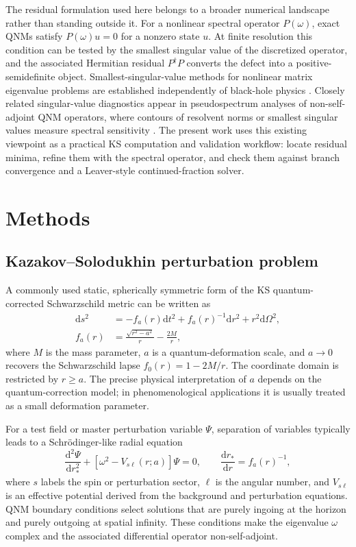 ﻿\documentclass[12pt,a4paper]{article}
\newcommand{\dd}{\mathrm{d}}
\begin{document}
The residual formulation used here belongs to a broader numerical landscape rather than standing outside it. For a nonlinear spectral operator \(P(\omega)\), exact QNMs satisfy \(P(\omega)u=0\) for a nonzero state \(u\). At finite resolution this condition can be tested by the smallest singular value of the discretized operator, and the associated Hermitian residual \(P^\dagger P\) converts the defect into a positive-semidefinite object. Smallest-singular-value methods for nonlinear matrix eigenvalue problems are established independently of black-hole physics \cite{Sadkane2023}. Closely related singular-value diagnostics appear in pseudospectrum analyses of non-self-adjoint QNM operators, where contours of resolvent norms or smallest singular values measure spectral sensitivity \cite{Jaramillo2021,Cao2024}. The present work uses this existing viewpoint as a practical KS computation and validation workflow: locate residual minima, refine them with the spectral operator, and check them against branch convergence and a Leaver-style continued-fraction solver.

\section{Methods}

\subsection{Kazakov--Solodukhin perturbation problem}

A commonly used static, spherically symmetric form of the KS quantum-corrected Schwarzschild metric can be written as
\begin{equation}
\begin{aligned}
\dd s^2 &=
-f_a(r)\dd t^2 + f_a(r)^{-1}\dd r^2
+ r^2 \dd\Omega^2,\\
f_a(r)&=\frac{\sqrt{r^2-a^2}}{r}-\frac{2M}{r},
\end{aligned}
\label{eq:ksmetric}
\end{equation}
where \(M\) is the mass parameter, \(a\) is a quantum-deformation scale, and \(a\to0\) recovers the Schwarzschild lapse \(f_0(r)=1-2M/r\). The coordinate domain is restricted by \(r\geq a\). The precise physical interpretation of \(a\) depends on the quantum-correction model; in phenomenological applications it is usually treated as a small deformation parameter.

For a test field or master perturbation variable \(\Psi\), separation of variables typically leads to a Schr\"odinger-like radial equation
\begin{equation}
\frac{\dd^2\Psi}{\dd r_*^2}+
\left[\omega^2 - V_{s\ell}(r;a)\right]\Psi=0,
\qquad
\frac{\dd r_*}{\dd r}=f_a(r)^{-1},
\label{eq:qnmwave}
\end{equation}
where \(s\) labels the spin or perturbation sector, \(\ell\) is the angular number, and \(V_{s\ell}\) is an effective potential derived from the background and perturbation equations. QNM boundary conditions select solutions that are purely ingoing at the horizon and purely outgoing at spatial infinity. These conditions make the eigenvalue \(\omega\) complex and the associated differential operator non-self-adjoint.
\end{document}
